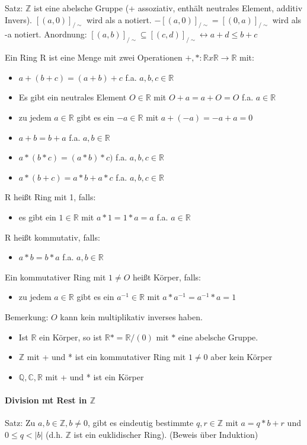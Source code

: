 \documentclass[10pt,landscape]{article}
\begin{document}
\begin{multicols}{3}
Satz: $\mathbb{Z}$ ist eine abelsche Gruppe (+ assoziativ, enthält neutrales Element, additiv Invers).
$[(a,0)]_{/\sim }$ wird als a notiert. $-[(a,0)]_{/\sim }=[(0,a)]_{/\sim }$ wird als -a notiert.
Anordnung: $[(a,b)]_{/\sim } \subseteq [(c,d)]_{/\sim } \leftrightarrow a+d\leq b+c$

Ein Ring R ist eine Menge mit zwei Operationen $+,*: \mathbb{R} x \mathbb{R} \rightarrow \mathbb{R}$ mit:
\begin{itemize}
    \item $a+(b+c) = (a+b)+c$ f.a. $a,b,c\in \mathbb{R}$
    \item Es gibt ein neutrales Element $O\in \mathbb{R}$ mit $O+a=a+O=O$ f.a. $a\in\mathbb{R}$
    \item zu jedem $a\in \mathbb{R}$ gibt es ein $-a\in \mathbb{R}$ mit $a+(-a)=-a+a=0$
    \item $a+b=b+a$ f.a. $a,b\in\mathbb{R}$
    \item $a*(b*c)=(a*b)*c)$ f.a. $a,b,c\in\mathbb{R}$
    \item $a*(b+c)=a*b+a*c$ f.a. $a,b,c\in\mathbb{R}$
\end{itemize}
R heißt Ring mit 1, falls:
\begin{itemize} 
    \item es gibt ein $1\in\mathbb{R}$ mit $a*1=1*a=a$ f.a. $a\in\mathbb{R}$
\end{itemize}
R heißt kommutativ, falls:
\begin{itemize}
    \item $a*b=b*a$ f.a. $a,b\in\mathbb{R}$
\end{itemize}
Ein kommutativer Ring mit $1\not=O$ heißt Körper, falls:
\begin{itemize}
    \item zu jedem $a\in\mathbb{R}$ gibt es ein $a^{-1}\in\mathbb{R}$ mit $a*a^{-1}=a^{-1}*a=1$
\end{itemize}

Bemerkung: $O$ kann kein multiplikativ inverses haben.
\begin{itemize}
    \item Ist $\mathbb{R}$ ein Körper, so ist $\mathbb{R}*=\mathbb{R} /(0)$ mit $*$ eine abelsche Gruppe.
    \item $\mathbb{Z}$ mit + und * ist ein kommutativer Ring mit $1 \not= 0$ aber kein Körper
    \item $\mathbb{Q}, \mathbb{C}, \mathbb{R}$ mit + und * ist ein Körper
\end{itemize}

\paragraph{Division mt Rest in $\mathbb{Z}$}
Satz: Zu $a,b\in\mathbb{Z}, b \not= 0$, gibt es eindeutig bestimmte $q,r\in \mathbb{Z}$ mit $a=q*b+r$ und $0\leq q <|b|$ (d.h. $\mathbb{Z}$ ist ein euklidischer Ring). (Beweis über Induktion)


\end{multicols}
\end{document}
